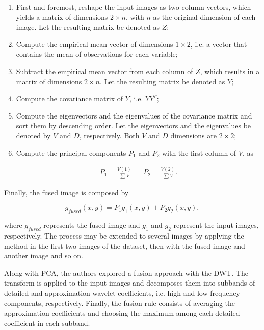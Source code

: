 \begin{enumerate}[label=\Roman* -]
    \item First and foremost, reshape the input images as two-column vectors, which yields a matrix of dimensions $2 \times n$, with $n$ as the original dimension of each image. Let the resulting matrix be denoted as $Z$;
    
    \item Compute the empirical mean vector of dimensions $1 \times 2$, i.e. a vector that contains the mean of observations for each variable;
    
    \item Subtract the empirical mean vector from each column of $Z$, which results in a matrix of dimensions $2 \times n$. Let the resulting matrix be denoted as $Y$;
    
    \item Compute the covariance matrix of $Y$, i.e. $YY^{T}$;
    
    \item Compute the eigenvectors and the eigenvalues of the covariance matrix and sort them by descending order. Let the eigenvectors and the eigenvalues be denoted by $V$ and $D$, respectively. Both $V$ and $D$ dimensions are $2 \times 2$;
    
    \item Compute the principal components $P_{1}$ and $P_{2}$ with the first column of $V$, as
    
    \begin{align}
    P_{1} = \frac{V(1)}{\sum V}
    &&
    P_{2} = \frac{V(2)}{\sum V}.
    \end{align}
\end{enumerate}

\noindent Finally, the fused image is composed by

\begin{equation}
g_{fused}(x,y) = P_{1}g_{1}(x,y) + P_{2}g_{2}(x,y),
\end{equation}

\noindent where $g_{fused}$ represents the fused image and $g_{1}$ and $g_{2}$ represent the input images, respectively. The process may be extended to several images by applying the method in the first two images of the dataset, then with the fused image and another image and so on.

Along with PCA, the authors explored a fusion approach with the DWT. The transform is applied to the input images and decomposes them into subbands of detailed and approximation wavelet coefficients, i.e. high and low-frequency components, respectively. Finally, the fusion rule consists of averaging the approximation coefficients and choosing the maximum among each detailed coefficient in each subband.

